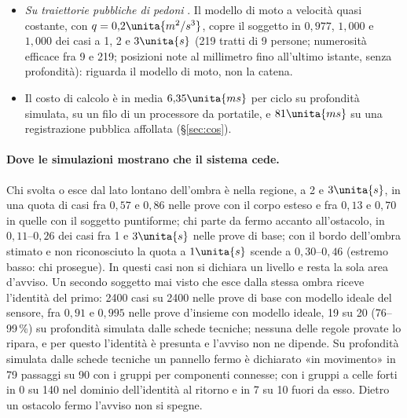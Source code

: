 \begin{itemize}
\item \emph{Su traiettorie pubbliche di pedoni} . Il modello di moto a velocità quasi costante, con $q=0{,}2\unita{m^2/s^3}$, copre il soggetto in $0{,}977$, $1{,}000$ e $1{,}000$ dei casi a 1, 2 e $3\unita{s}$ (219 tratti di 9 persone; numerosità efficace fra 9 e 219; posizioni note al millimetro fino all'ultimo istante, senza profondità): riguarda il modello di moto, non la catena.
\item Il costo di calcolo è in media $6{,}35\unita{ms}$ per ciclo su profondità simulata, su un filo di un processore da portatile, e $81\unita{ms}$ su una registrazione pubblica affollata (\S\ref{sec:cos}).
\end{itemize}

\paragraph{Dove le simulazioni mostrano che il sistema cede.} Chi svolta o esce dal lato lontano dell'ombra è nella regione, a 2 e $3\unita{s}$, in una quota di casi fra $0{,}57$ e $0{,}86$ nelle prove con il corpo esteso e fra $0{,}13$ e $0{,}70$ in quelle con il soggetto puntiforme; chi parte da fermo accanto all'ostacolo, in $0{,}11$--$0{,}26$ dei casi fra 1 e $3\unita{s}$ nelle prove di base; con il bordo dell'ombra stimato e non riconosciuto la quota a $1\unita{s}$ scende a $0{,}30$--$0{,}46$ (estremo basso: chi prosegue). In questi casi non si dichiara un livello e resta la sola area d'avviso. Un secondo soggetto mai visto che esce dalla stessa ombra riceve l'identità del primo: 2400 casi su 2400 nelle prove di base con modello ideale del sensore, fra $0{,}91$ e $0{,}995$ nelle prove d'insieme con modello ideale, 19 su 20 (76--99\,\%) su profondità simulata dalle schede tecniche; nessuna delle regole provate lo ripara, e per questo l'identità è presunta e l'avviso non ne dipende. Su profondità simulata dalle schede tecniche un pannello fermo è dichiarato «in movimento» in 79 passaggi su 90 con i gruppi per componenti connesse; con i gruppi a celle forti in 0 su 140 nel dominio dell'identità al ritorno e in 7 su 10 fuori da esso. Dietro un ostacolo fermo l'avviso non si spegne.


